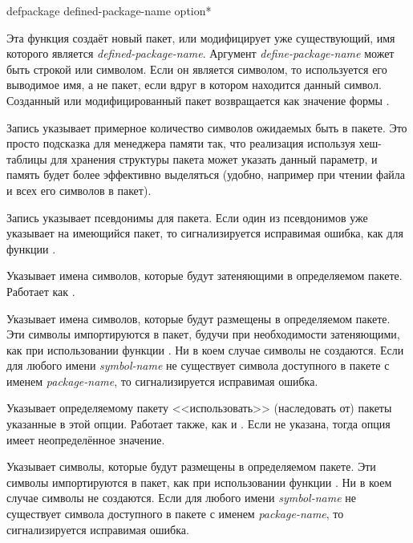 \begin{defmac}
defpackage defined-package-name {option}*

Эта функция создаёт новый пакет, или модифицирует уже существующий, имя которого
является \emph{defined-package-name}. Аргумент \emph{define-package-name} может
быть строкой или символом.
Если он является символом, то используется его выводимое имя, а не пакет, если
вдруг в котором находится данный символ.
Созданный или модифицированный пакет возвращается как значение формы
.

\begin{flushdesc}
\item[\cd{(:size \emph{integer})}]
Запись указывает примерное количество символов ожидаемых быть в пакете. 
Это просто подсказка для менеджера памяти так, что реализация используя
хеш-таблицы для хранения структуры пакета может указать данный параметр, и
память будет более эффективно выделяться (удобно, например при чтении файла и
всех его символов в пакет).

\item[\cd{(:nicknames \Mstar\emph{package-name})}]
Запись указывает псевдонимы для пакета.
Если один из псевдонимов уже указывает на имеющийся пакет, то сигнализируется
исправимая ошибка, как для функции .

\item[\cd{(:shadow \Mstar\emph{symbol-name})}]
Указывает имена символов, которые будут затеняющими в определяемом
пакете. Работает как .

\item[\cd{(:shadowing-import-from \emph{package-name} \Mstar\emph{symbol-name})}]
Указывает имена символов, которые будут размещены в определяемом пакете.
Эти символы импортируются в пакет, будучи при необходимости затеняющими, как при
использовании функции .
Ни в коем случае символы не создаются.
Если для любого имени \emph{symbol-name} не существует символа доступного в
пакете с именем \emph{package-name}, то сигнализируется исправимая ошибка.

\item[\cd{(:use \Mstar\emph{package-name})}]
Указывает определяемому пакету <<использовать>> (наследовать от) пакеты
указанные в этой опции. Работает также, как и .
Если  не указана, тогда опция имеет неопределённое значение.

\item[\cd{(:import-from \emph{package-name} \Mstar\emph{symbol-name})}]
Указывает символы, которые будут размещены в определяемом пакете.
Эти символы импортируются в пакет, как при использовании функции .
Ни в коем случае символы не создаются.
Если для любого имени \emph{symbol-name} не существует символа доступного в
пакете с именем \emph{package-name}, то сигнализируется исправимая ошибка.


\end{flushdesc}
\end{defmac}
